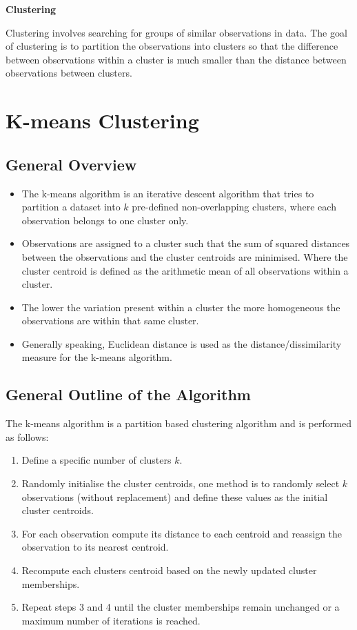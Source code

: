 \documentclass[]{article}
\begin{document}
	
\centerline{\Huge \textbf{Clustering}}
\vspace{0.25cm}
\noindent Clustering involves searching for groups of similar observations in data. The goal of clustering is to partition the observations into clusters so that the difference between observations within a cluster is much smaller than the distance between observations between clusters.

\section{K-means Clustering}
\subsection{General Overview}
\begin{itemize}
	\item The k-means algorithm is an iterative descent algorithm that tries to partition a dataset into $k$ pre-defined non-overlapping clusters, where each observation belongs to one cluster only. 
	\item Observations are assigned to a cluster such that the sum of squared distances between the observations and the cluster centroids are minimised. Where the cluster centroid is defined as the arithmetic mean of all observations within a cluster.
	\item The lower the variation present within a cluster the more homogeneous the observations are within that same cluster.  
	\item Generally speaking, Euclidean distance is used as the distance/dissimilarity measure for the k-means algorithm. 
\end{itemize}

\subsection{General Outline of the Algorithm}
The k-means algorithm is a partition based clustering algorithm and is performed as follows:
\begin{enumerate}
	\item Define a specific number of clusters $k$.
	\item Randomly initialise the cluster centroids, one method is to randomly select $k$ observations (without replacement) and define these values as the initial cluster centroids.
	\item For each observation compute its distance to each centroid and reassign the observation to its nearest centroid.
	\item Recompute each clusters centroid based on the newly updated cluster memberships.
	\item Repeat steps 3 and 4 until the cluster memberships remain unchanged or a maximum number of iterations is reached.
\end{enumerate}
\end{document}
